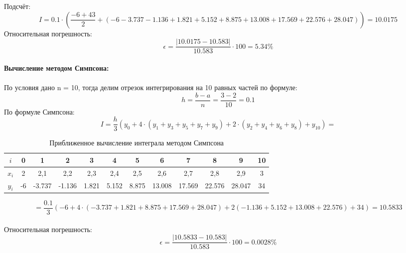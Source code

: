 \documentclass{article}
\begin{document}
Подсчёт:
\[I = 0.1\cdot \left(\frac{-6+43}{2}+(-6-3.737-1.136+1.821+5.152+8.875+13.008+17.569+22.576 +28.047)\right) = 10.0175\]
Относительная погрешность:
\[\epsilon = \frac{|10.0175 - 10.583|}{10.583}\cdot 100 = 5.34\%\]
\\
\textbf{Вычисление методом Симпсона:}\\ \\
По условия дано n = 10, тогда делим отрезок интегрирования на 10 равных частей по формуле:
\[h=\frac{b-a}{n} = \frac{3-2}{10} = 0.1\]
По формуле Симпсона:
\[I = \frac{h}{3}(y_0+ 4\cdot(y_1 + y_3+ y_5+ y_7+ y_9)+2\cdot(y_2 + y_4+ y_6+ y_8) + y_{10}) = \] 
\begin{table}[H]
    \centering
    \begin{tabular}{|c|c|c|c|c|c|c|c|c|c|c|c|}
        \hline
        $i$ & 0 & 1 & 2 & 3 & 4 & 5 & 6& 7& 8& 9& 10\\
        \hline
        $x_i$ & 2 & 2,1 & 2,2& 2,3& 2,4& 2,5& 2,6& 2,7& 2,8& 2,9& 3\\
        \hline
        $y_i$ &-6& -3.737& -1.136& 1.821& 5.152& 8.875& 13.008& 17.569& 22.576& 28.047& 34 \\
        \hline
        \end{tabular}
        \caption{Приближенное вычисление интеграла методом Симпсона}
        \label{tab:midpoint_approximation}  
\end{table}

\[= \frac{0.1}{3}(-6+ 4\cdot(-3.737 + 1.821+ 8.875+ 17.569+ 28.047)+2(-1.136 + 5.152+ 13.008+ 22.576) + 34) = 10.5833\]\\
Относительная погрешность:
\[\epsilon = \frac{|10.5833 - 10.583|}{10.583}\cdot 100 = 0.0028\%\]
\\
\end{document}
